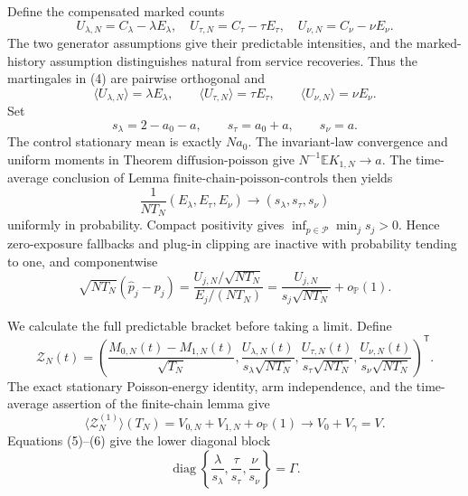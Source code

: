 Define the compensated marked counts
\[
 U_{\lambda,N}=C_\lambda-\lambda E_\lambda,
 \quad
 U_{\tau,N}=C_\tau-\tau E_\tau,
 \quad
 U_{\nu,N}=C_\nu-\nu E_\nu.                                  \tag{4}
\]
The two generator assumptions give their predictable intensities, and the marked-history assumption distinguishes natural from service recoveries.  Thus the martingales in (4) are pairwise orthogonal and
\[
 \langle U_{\lambda,N}\rangle=\lambda E_\lambda,
 \qquad
 \langle U_{\tau,N}\rangle=\tau E_\tau,
 \qquad
 \langle U_{\nu,N}\rangle=\nu E_\nu.                        \tag{5}
\]
Set
\[
 s_\lambda=2-a_0-a,
 \qquad s_\tau=a_0+a,
 \qquad s_\nu=a.
\]
The control stationary mean is exactly \(Na_0\).  The invariant-law convergence and uniform moments in Theorem \(\mathrm{diffusion\mbox{-}poisson}\) give \(N^{-1}\mathbb E K_{1,N}\to a\).  The time-average conclusion of Lemma \(\mathrm{finite\mbox{-}chain\mbox{-}poisson\mbox{-}controls}\) then yields
\[
 \frac1{NT_N}(E_\lambda,E_\tau,E_\nu)
 \longrightarrow(s_\lambda,s_\tau,s_\nu)                    \tag{6}
\]
uniformly in probability.  Compact positivity gives \(\inf_{p\in\mathcal P}\min_j s_j>0\).  Hence zero-exposure fallbacks and plug-in clipping are inactive with probability tending to one, and componentwise
\[
 \sqrt{NT_N}(\widehat p_j-p_j)
 =\frac{U_{j,N}/\sqrt{NT_N}}{E_j/(NT_N)}
 =\frac{U_{j,N}}{s_j\sqrt{NT_N}}+o_{\mathbb P}(1).             \tag{7}
\]

We calculate the full predictable bracket before taking a limit.  Define
\[
 \mathcal Z_N(t)=\left(
 \frac{M_{0,N}(t)-M_{1,N}(t)}{\sqrt{T_N}},
 \frac{U_{\lambda,N}(t)}{s_\lambda\sqrt{NT_N}},
 \frac{U_{\tau,N}(t)}{s_\tau\sqrt{NT_N}},
 \frac{U_{\nu,N}(t)}{s_\nu\sqrt{NT_N}}
 \right)^{\mathsf T}.                                        \tag{8}
\]
The exact stationary Poisson-energy identity, arm independence, and the time-average assertion of the finite-chain lemma give
\[
 \langle\mathcal Z_N^{(1)}\rangle(T_N)
 =V_{0,N}+V_{1,N}+o_{\mathbb P}(1)
 \longrightarrow V_0+V_\gamma=V.                             \tag{9}
\]
Equations (5)--(6) give the lower diagonal block
\[
 \operatorname{diag}\left\{\frac\lambda{s_\lambda},
 \frac\tau{s_\tau},\frac\nu{s_\nu}\right\}=\Gamma.       \tag{10}
\]

